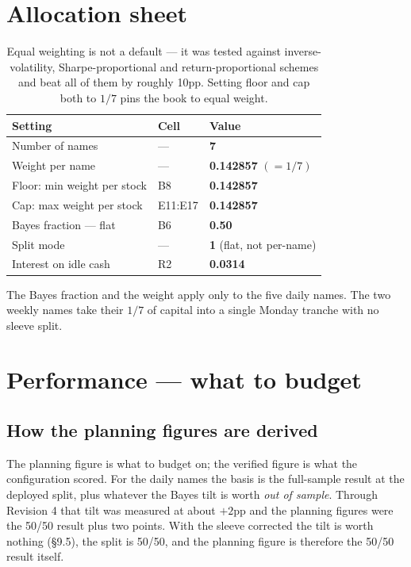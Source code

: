 \documentclass[11pt]{article}
\begin{document}
\section{Allocation sheet}

\begin{table}[H]\centering\small
\begin{tabular}{lll}
\toprule
\textbf{Setting} & \textbf{Cell} & \textbf{Value}\\
\midrule
\rowcolor{bckeep} Number of names & --- & \textbf{7}\\
Weight per name & --- & \textbf{0.142857} $(=1/7)$\\
\rowcolor{bcact} Floor: min weight per stock & B8 & \textbf{0.142857}\\
Cap: max weight per stock & E11:E17 & \textbf{0.142857}\\
\rowcolor{bckeep} Bayes fraction --- flat & B6 & \textbf{0.50}\\
Split mode & --- & \textbf{1} (flat, not per-name)\\
\rowcolor{bckeep} Interest on idle cash & R2 & \textbf{0.0314}\\
\bottomrule
\end{tabular}
\caption{Equal weighting is not a default --- it was tested against inverse-volatility,
Sharpe-proportional and return-proportional schemes and beat all of them by roughly 10pp.
Setting floor and cap both to $1/7$ pins the book to equal weight.}
\end{table}

The Bayes fraction and the weight apply only to the five daily names. The two weekly names take
their $1/7$ of capital into a single Monday tranche with no sleeve split.

\section{Performance --- what to budget}

\subsection{How the planning figures are derived}

The planning figure is what to budget on; the verified figure is what the configuration scored.
For the daily names the basis is the full-sample result at the deployed split, plus whatever the
Bayes tilt is worth \emph{out of sample}. Through Revision 4 that tilt was measured at about
$+2$pp and the planning figures were the 50/50 result plus two points. With the sleeve corrected
the tilt is worth nothing (\S9.5), the split is 50/50, and the planning figure is therefore the
50/50 result itself.
\end{document}

